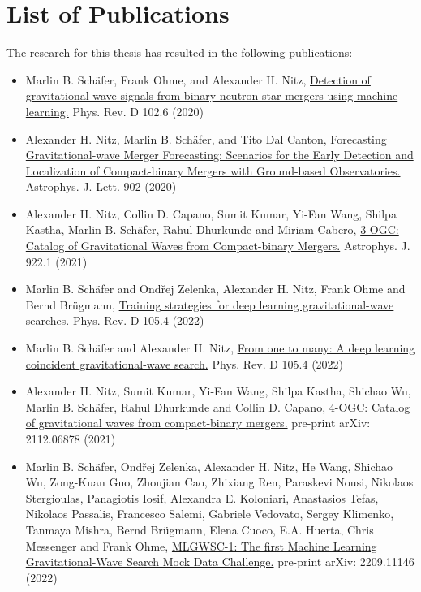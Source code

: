 \chapter{List of Publications}\label{app:publications}
The research for this thesis has resulted in the following publications:
\begin{itemize}
	\item[\cite{Schafer:2020kor}] Marlin B. Schäfer, Frank Ohme, and Alexander H. Nitz, \href{https://doi.org/10.1103/PhysRevD.102.063015}{Detection of gravitational-wave signals from binary neutron star mergers using machine learning.} Phys. Rev. D 102.6 (2020)
	\item[\cite{Nitz:2020vym}] Alexander H. Nitz, Marlin B. Schäfer, and Tito Dal Canton, Forecasting \href{https://doi.org/10.3847/2041-8213/abbc10}{Gravitational-wave Merger Forecasting: Scenarios for the Early Detection and Localization of Compact-binary Mergers with Ground-based Observatories.} Astrophys. J. Lett. 902 (2020)
	\item[\cite{Nitz:2021uxj}] Alexander H. Nitz, Collin D. Capano, Sumit Kumar, Yi-Fan Wang, Shilpa Kastha, Marlin B. Schäfer, Rahul Dhurkunde and Miriam Cabero, \href{https://doi.org/10.3847/1538-4357/ac1c03}{3-OGC: Catalog of Gravitational Waves from Compact-binary Mergers.} Astrophys. J. 922.1 (2021)
	\item[\cite{Schafer:2021fea}] Marlin B. Schäfer and Ond\v{r}ej Zelenka, Alexander H. Nitz, Frank Ohme and Bernd Brügmann, \href{https://doi.org/10.1103/PhysRevD.105.043002}{Training strategies for deep learning gravitational-wave searches.} Phys. Rev. D 105.4 (2022)
	\item[\cite{Schafer:2021cml}] Marlin B. Schäfer and Alexander H. Nitz, \href{https://doi.org/10.1103/PhysRevD.105.043003}{From one to many: A deep learning coincident gravitational-wave search.} Phys. Rev. D 105.4 (2022)
	\item[\cite{Nitz:2021zwj}] Alexander H. Nitz, Sumit Kumar, Yi-Fan Wang, Shilpa Kastha, Shichao Wu, Marlin B. Schäfer, Rahul Dhurkunde and Collin D. Capano, \href{http://arxiv.org/abs/2112.06878}{4-OGC: Catalog of gravitational waves from compact-binary mergers.} pre-print arXiv: 2112.06878 (2021)
	\item[\cite{Schafer:2022dxv}] Marlin B. Schäfer, Ond\v{r}ej Zelenka, Alexander H. Nitz, He Wang, Shichao Wu, Zong-Kuan Guo, Zhoujian Cao, Zhixiang Ren, Paraskevi Nousi, Nikolaos Stergioulas, Panagiotis Iosif, Alexandra E. Koloniari, Anastasios Tefas, Nikolaos Passalis, Francesco Salemi, Gabriele Vedovato, Sergey Klimenko, Tanmaya Mishra, Bernd Brügmann, Elena Cuoco, E.A. Huerta, Chris Messenger and Frank Ohme, \href{http://arxiv.org/abs/2209.11146}{MLGWSC-1: The first Machine Learning Gravitational-Wave Search Mock Data Challenge.} pre-print arXiv: 2209.11146 (2022)
\end{itemize}